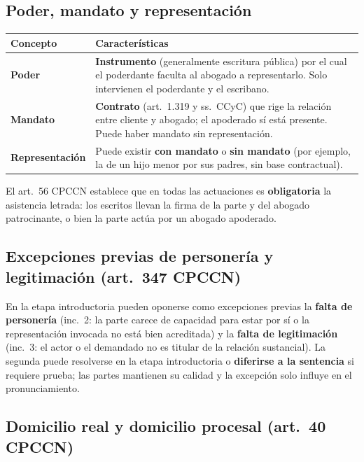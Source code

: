 \documentclass[12pt,oneside]{book}
\renewcommand{\arraystretch}{1.15}
\begin{document}
\subsection{Poder, mandato y representación}

\begin{table}[H]
\centering
\renewcommand{\arraystretch}{1.25}
\begin{tabularx}{\textwidth}{>{\bfseries\RaggedRight\arraybackslash}p{}>{\RaggedRight\arraybackslash}X}
\toprule
Concepto & Características \\
\midrule
Poder & \textbf{Instrumento} (generalmente escritura pública) por el cual el poderdante faculta al abogado a representarlo. Solo intervienen el poderdante y el escribano. \\
\addlinespace
Mandato & \textbf{Contrato} (art.~1.319 y ss.\ CCyC) que rige la relación entre cliente y abogado; el apoderado sí está presente. Puede haber mandato sin representación. \\
\addlinespace
Representación & Puede existir \textbf{con mandato} o \textbf{sin mandato} (por ejemplo, la de un hijo menor por sus padres, sin base contractual). \\
\bottomrule
\end{tabularx}
\end{table}

El art.~56 CPCCN establece que en todas las actuaciones es \textbf{obligatoria} la asistencia letrada: los escritos llevan la firma de la parte y del abogado patrocinante, o bien la parte actúa por un abogado apoderado.

\subsection{Excepciones previas de personería y legitimación (art.~347 CPCCN)}

En la etapa introductoria pueden oponerse como excepciones previas la \textbf{falta de personería} (inc.~2: la parte carece de capacidad para estar por sí o la representación invocada no está bien acreditada) y la \textbf{falta de legitimación} (inc.~3: el actor o el demandado no es titular de la relación sustancial). La segunda puede resolverse en la etapa introductoria o \textbf{diferirse a la sentencia} si requiere prueba; las partes mantienen su calidad y la excepción solo influye en el pronunciamiento.

\subsection{Domicilio real y domicilio procesal (art.~40 CPCCN)}
\end{document}
